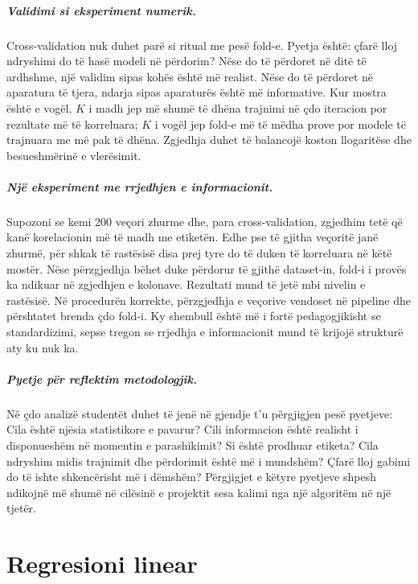\documentclass[12pt,a4paper,oneside]{book}
\begin{document}
\paragraph{Validimi si eksperiment numerik.}
Cross-validation nuk duhet parë si ritual me pesë fold-e. Pyetja është: çfarë lloj ndryshimi do të hasë modeli në përdorim? Nëse do të përdoret në ditë të ardhshme, një validim sipas kohës është më realist. Nëse do të përdoret në aparatura të tjera, ndarja sipas aparaturës është më informative. Kur mostra është e vogël, $K$ i madh jep më shumë të dhëna trajnimi në çdo iteracion por rezultate më të korreluara; $K$ i vogël jep fold-e më të mëdha prove por modele të trajnuara me më pak të dhëna. Zgjedhja duhet të balancojë koston llogaritëse dhe besueshmërinë e vlerësimit.

\paragraph{Një eksperiment me rrjedhjen e informacionit.}
Supozoni se kemi 200 veçori zhurme dhe, para cross-validation, zgjedhim tetë që kanë korelacionin më të madh me etiketën. Edhe pse të gjitha veçoritë janë zhurmë, për shkak të rastësisë disa prej tyre do të duken të korreluara në këtë mostër. Nëse përzgjedhja bëhet duke përdorur të gjithë dataset-in, fold-i i provës ka ndikuar në zgjedhjen e kolonave. Rezultati mund të jetë mbi nivelin e rastësisë. Në procedurën korrekte, përzgjedhja e veçorive vendoset në pipeline dhe përshtatet brenda çdo fold-i. Ky shembull është më i fortë pedagogjikisht se standardizimi, sepse tregon se rrjedhja e informacionit mund të krijojë strukturë aty ku nuk ka.

\paragraph{Pyetje për reflektim metodologjik.}
Në çdo analizë studentët duhet të jenë në gjendje t'u përgjigjen pesë pyetjeve: Cila është njësia statistikore e pavarur? Cili informacion është realisht i disponueshëm në momentin e parashikimit? Si është prodhuar etiketa? Cila ndryshim midis trajnimit dhe përdorimit është më i mundshëm? Çfarë lloj gabimi do të ishte shkencërisht më i dëmshëm? Përgjigjet e këtyre pyetjeve shpesh ndikojnë më shumë në cilësinë e projektit sesa kalimi nga një algoritëm në një tjetër.

\chapter[Regresioni linear]{Regresioni linear}
\end{document}
